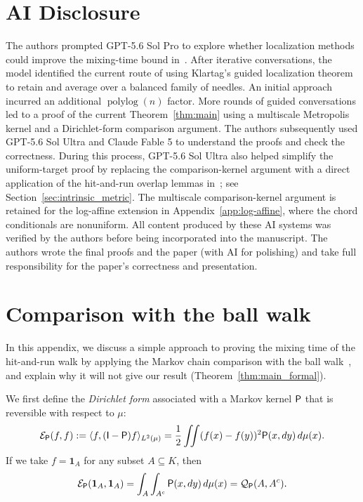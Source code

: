 \documentclass[11pt]{article}
\theoremstyle{definition}
\theoremstyle{remark}
\newcommand{\one}{\mathbf 1}
\newcommand{\Id}{\mathsf I}
\begin{document}
\section*{AI Disclosure}
The authors prompted GPT-5.6 Sol Pro to explore whether localization methods could improve the mixing-time bound in~\cite{CE}. After iterative conversations, the model identified the current route of using Klartag's guided localization theorem~\cite{KlartagNeedles} to retain and average over a balanced family of needles. An initial approach incurred an additional $\operatorname{polylog}(n)$ factor.  More rounds of guided conversations led to a proof of the current Theorem~\ref{thm:main} using a multiscale Metropolis kernel and a Dirichlet-form comparison argument. The authors subsequently used GPT-5.6 Sol Ultra and Claude Fable 5 to understand the proofs and check the correctness. During this process, GPT-5.6 Sol Ultra also helped simplify the uniform-target proof by replacing the comparison-kernel argument with a direct application of the hit-and-run overlap lemmas in~\cite{LovaszHR,LV}; see Section~\ref{sec:intrinsic_metric}.  The multiscale comparison-kernel argument is retained for the log-affine extension in Appendix~\ref{app:log-affine}, where the chord conditionals are nonuniform. All content produced by these AI systems was verified by the authors before being incorporated into the manuscript.  The authors wrote the final proofs and the paper (with AI for polishing) and take full responsibility for the paper's correctness and presentation.

\newpage
\appendix

\section{Comparison with the ball walk}
\label{sec:ball-speedy}

In this appendix, we discuss a simple approach to proving the mixing time of the hit-and-run walk by applying the Markov chain comparison with the ball walk~\cite{RudolfUllrichComparison}, and explain why it will not give our result (Theorem~\ref{thm:main_formal}). 

We first define the \emph{Dirichlet form} associated with a Markov kernel ${\sf P}$ that is reversible with respect to $\mu$:
\begin{align*}
    \mathcal E_{\mathsf P}(f,f) :=  \langle f,(\Id-\mathsf P)f\rangle_{L^2(\mu)}=\frac{1}{2}\iint(f(x)-f(y))^2{\sf P}(x,dy) \,d\mu(x).
\end{align*}
If we take $f=\one_A$ for any subset $A\subseteq K$, then
\begin{align}\label{eq:Dirichlet_to_flow}
    \mathcal{E}_{\sf P}(\one_A,\one_A)=\int_A\int_{A^c}{\sf P}(x,dy)\,d\mu(x)={\cal Q}_{\sf P}(A,A^c).
\end{align}
\end{document}
